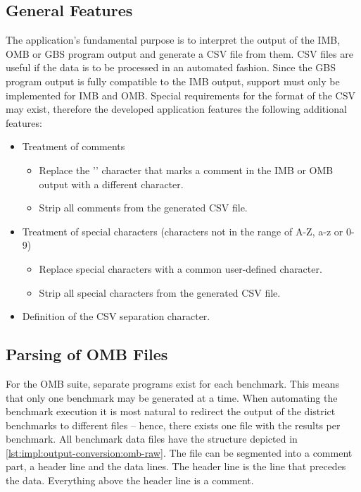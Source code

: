 \subsection{General Features}

The application's fundamental purpose is to interpret the output of the \ac{IMB}, \ac{OMB} or \ac{GBS} program output and generate a \acs{CSV} file from them. \acs{CSV} files are useful if the data is to be processed in an automated fashion. Since the \ac{GBS} program output is fully compatible to the \ac{IMB} output, support must only be implemented for \ac{IMB} and \ac{OMB}. Special requirements for the format of the \ac{CSV} may exist, therefore the developed application features the following additional features:
\begin{itemize}
	\item Treatment of comments
	\begin{itemize}
		\item Replace the '\code{\#}' character that marks a comment in the \ac{IMB} or \ac{OMB} output with a different character.
		\item Strip all comments from the generated \acs{CSV} file.
	\end{itemize}
	\item Treatment of special characters (characters not in the range of A-Z, a-z or 0-9)
	\begin{itemize}
		\item Replace special characters with a common user-defined character.
		\item Strip all special characters from the generated \acs{CSV} file.
	\end{itemize}
	\item Definition of the \acs{CSV} separation character.
\end{itemize}

\subsection{Parsing of \acs{OMB} Files}

For the \ac{OMB} suite, separate programs exist for each benchmark. This means that only one benchmark may be generated at a time. When automating the benchmark execution it is most natural to redirect the output of the district benchmarks to different files -- hence, there exists one file with the results per benchmark. All benchmark data files have the structure depicted in \autoref{lst:impl:output-conversion:omb-raw}. The file can be segmented into a comment part, a header line and the data lines. The header line is the line that precedes the data. Everything above the header line is a comment. 

